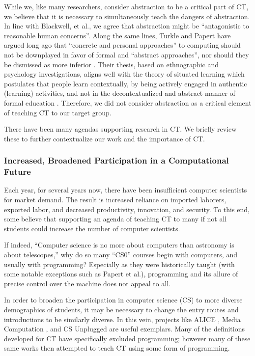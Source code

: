 \documentclass{acm_proc_article-sp}
\begin{document}
While we, like many researchers, consider abstraction to be a critical part of CT, we believe that it is necessary to simultaneously teach the dangers of abstraction. 
In line with Blackwell, et al., we agree that abstraction might be ``antagonistic to reasonable human concerns''\cite{blackwell2008abstract}. 
Along the same lines, Turkle and Papert have argued long ago that ``concrete and personal approaches'' to computing should not be downplayed in favor of formal and ``abstract approaches'', nor should they be dismissed as more inferior \cite{turkle1990epistemological}. 
Their thesis, based on ethnographic and psychology investigations, aligns well with the theory of situated learning which postulates that people learn contextually, by being actively engaged in authentic (learning) activities, and not in the decontextualized and abstract manner of formal education \cite{brown1989situated}. 
Therefore, we did not consider abstraction as a critical element of teaching CT to our target group.

There have been many agendas supporting research in CT. We briefly review these to further contextualize our work and the importance of CT.

\subsubsection{Increased, Broadened Participation in a Computational Future}
\label{sec:recruitment}
Each year, for several years now, there have been insufficient computer scientists for market demand.
The result is increased reliance on imported laborers, exported labor, and decreased productivity, innovation, and security.
To this end, some believe that supporting an agenda of teaching CT to many if not all students could increase the number of computer scientists.

If indeed, ``Computer science is no more about computers than astronomy is about telescopes,''\cite{cs-astronomy} why do so many ``CS0'' courses begin with computers, and usually with programming? Especially as they were historically taught (with some notable exceptions such as Papert et al.)\cite{logo-readings}, programming and its allure of precise control over the machine does not appeal to all.

In order to broaden the participation in computer science (CS) to more diverse demographics of students, it may be necessary to change the entry routes and introductions to be similarly diverse. 
In this vein, projects like ALICE \cite{pausch1995alice}, Media Computation \cite{guzdial2003media}, and CS Unplugged \cite{csunplugged} are useful exemplars.
Many of the definitions developed for CT have specifically excluded programming; however many of these same works then attempted to teach CT using some form of programming.
\end{document}
